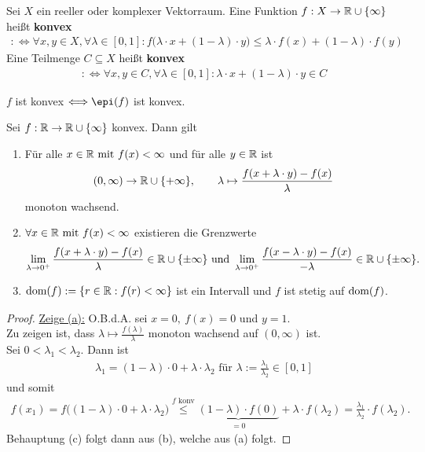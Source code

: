 \begin{definition}
Sei $X$ ein reeller oder komplexer Vektorraum. Eine Funktion $f:X\to\mathbb{R}\cup\lbrace\infty\rbrace$ heißt \textbf{konvex}
\begin{align*}
:\Longleftrightarrow
\forall x,y\in X,\forall\lambda\in[0,1]:f\big(\lambda\cdot x+(1-\lambda)\cdot y\big)
\leq\lambda\cdot f(x)+(1-\lambda)\cdot f(y) 
\end{align*}
Eine Teilmenge $C\subseteq X$ heißt \textbf{konvex}
\begin{align*}
:\Longleftrightarrow
\forall x,y\in C,\forall\lambda\in[0,1]:\lambda\cdot x+(1-\lambda)\cdot y\in C
\end{align*}
\end{definition}

\begin{lemma}
$f$ ist konvex $\Longleftrightarrow\epi(f)$ ist konvex.
\end{lemma}

\begin{lemma}
Sei $f:\mathbb{R}\to\mathbb{R}\cup\lbrace\infty\rbrace$ konvex. Dann gilt
\begin{enumerate}[label=(\alph*)]
\item Für alle $x\in\mathbb{R}\text{ mit } f(x)<\infty$ und für alle $y\in\mathbb{R}$ ist
\begin{align*}
(0,\infty)\to\mathbb{R}\cup\lbrace +\infty\rbrace,\qquad
\lambda\mapsto\frac{f(x+\lambda\cdot y)-f(x)}{\lambda}
\end{align*}
monoton wachsend.
\item $\forall x\in\mathbb{R}\text{ mit } f(x)<\infty$ existieren die Grenzwerte
\begin{align*}
\lim\limits_{\lambda\to0^+}\frac{f(x+\lambda\cdot y)-f(x)}{\lambda}\in\mathbb{R}\cup\lbrace\pm\infty\rbrace
\text{ und }
\lim\limits_{\lambda\to0^+}\frac{f(x-\lambda\cdot y)-f(x)}{-\lambda}\in\mathbb{R}\cup\lbrace\pm\infty\rbrace.
\end{align*}
\item 
$\begin{aligned}
\text{dom}(f):=\lbrace r\in\mathbb{R}:f(r)<\infty\rbrace
\end{aligned}$ 
ist ein Intervall und $f$ ist stetig auf $\text{dom}(f)$.
\end{enumerate}
\end{lemma}
\begin{proof}
\underline{Zeige (a):} O.B.d.A. sei $x=0,~f(x)=0$ und $y=1$.\\
Zu zeigen ist, dass $\lambda\mapsto\frac{f(\lambda)}{\lambda}$ monoton wachsend auf $(0,\infty)$ ist.\\
Sei $0<\lambda_1<\lambda_2$. Dann ist 
\begin{align*}
\lambda_1=(1-\lambda)\cdot 0+\lambda\cdot\lambda_2\text{ für }\lambda:=\frac{\lambda_1}{\lambda_2}\in[0,1]
\end{align*}
und somit
\begin{align*}
f(x_1)
=
f\Big((1-\lambda)\cdot0+\lambda\cdot\lambda_2\Big)
\stackrel{f\text{ konv}}{\leq}
\underbrace{(1-\lambda)\cdot f(0)}_{=0}+\lambda\cdot f(\lambda_2)
=
\frac{\lambda_1}{\lambda_2}\cdot f(\lambda_2).
\end{align*}
Behauptung (c) folgt dann aus (b), welche aus (a) folgt.
\end{proof}

